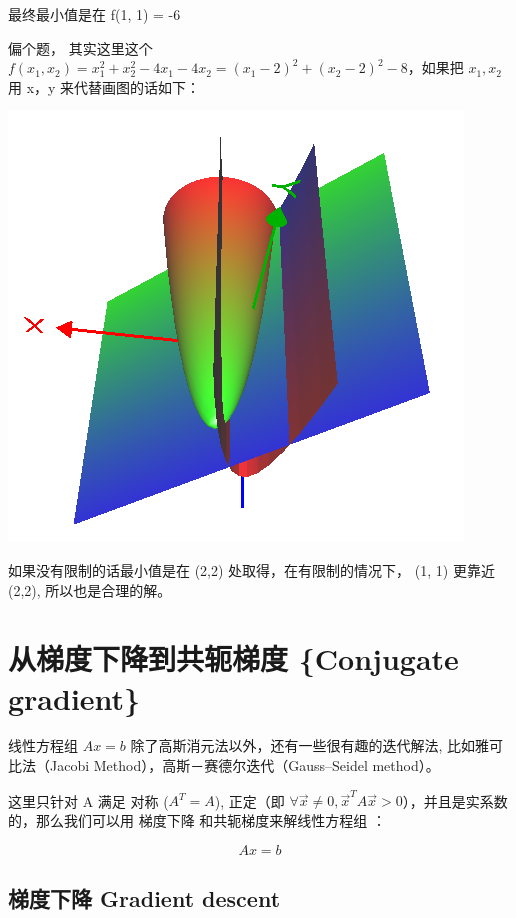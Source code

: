 \documentclass[
]{book}
\begin{document}
最终最小值是在 f(1, 1) = -6

偏个题， 其实这里这个 \(f(x_1, x_2) = x_1^2 + x_2^2 - 4x_1 - 4x_2 = (x_1 -2)^ 2 + (x_2 - 2)^2 - 8\)，如果把 \(x_1, x_2\) 用 x，y 来代替画图的话如下：

\includegraphics{images/kkt_ex01.png}

如果没有限制的话最小值是在 (2,2) 处取得，在有限制的情况下， (1, 1) 更靠近 (2,2), 所以也是合理的解。

\hypertarget{ux4eceux68afux5ea6ux4e0bux964dux5230ux5171ux8f6dux68afux5ea6-conjugate-gradient}{%
\chapter{从梯度下降到共轭梯度 \{Conjugate gradient\}}\label{ux4eceux68afux5ea6ux4e0bux964dux5230ux5171ux8f6dux68afux5ea6-conjugate-gradient}}

线性方程组 \(Ax =b\) 除了高斯消元法以外，还有一些很有趣的迭代解法, 比如雅可比法（Jacobi Method），高斯－赛德尔迭代（Gauss--Seidel method）。

这里只针对 A 满足 对称 (\(A^T = A\)), 正定（即 \({\displaystyle \forall {\vec {x}}\neq 0,{\vec {x}}^{T}A{\vec {x}}>0}\)），并且是实系数的，那么我们可以用 梯度下降 和共轭梯度来解线性方程组 ：

\[Ax = b\]

\hypertarget{ux68afux5ea6ux4e0bux964d-gradient-descent}{%
\section{梯度下降 Gradient descent}\label{ux68afux5ea6ux4e0bux964d-gradient-descent}}
\end{document}

